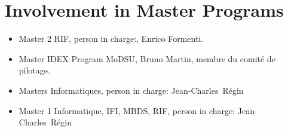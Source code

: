 \documentclass[a4paper]{article}
\newcommand{\nome}[1]{#1}
\newcommand{\cognome}[1]{#1}
\newcommand{\person}[2]{\nome{#1}\ \cognome{#2}\xspace}
\newcommand{\JCR}{\person{Jean-Charles}{Régin}}
\begin{document}
\section{Involvement in Master Programs}
\begin{itemize}
 
 \item Master 2 RIF, person in charge:, Enrico Formenti.
 \item Master IDEX Program MoDSU, Bruno Martin, membre du comité de pilotage.
 
 \item Masters Informatiques, person in charge: \JCR
 \item Master 1 Informatique, IFI, MBDS, RIF, person in charge: \JCR
\end{itemize}
\end{document}
